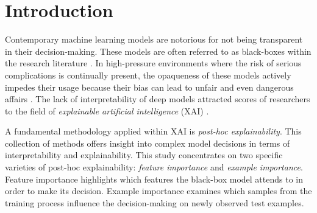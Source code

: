 \section{Introduction}

Contemporary machine learning models are notorious for not being transparent in their decision-making. These models are often referred to as black-boxes within the research literature \cite{blackboxPWK, blackboxPoon}. In high-pressure environments where the risk of serious complications is continually present, the opaqueness of these models actively impedes their usage because their bias can lead to unfair and even dangerous affairs \cite{RecidivismRandomForest, MedicalImagingFailure}. The lack of interpretability of deep models attracted scores of researchers to the field of \textit{explainable artificial intelligence} (XAI) \cite{NonAdditiveExplainability, EntropyBasedExplainability, GuidelinesXAI}. %

A fundamental methodology applied within XAI is \textit{post-hoc explainability}. This collection of methods offers insight into complex model decisions in terms of interpretability and explainability. This study concentrates on two specific varieties of post-hoc explainability: \textit{feature importance} and \textit{example importance}. Feature importance highlights which features the black-box model attends to in order to make its decision. Example importance examines which samples from the training process influence the decision-making on newly observed test examples. %

